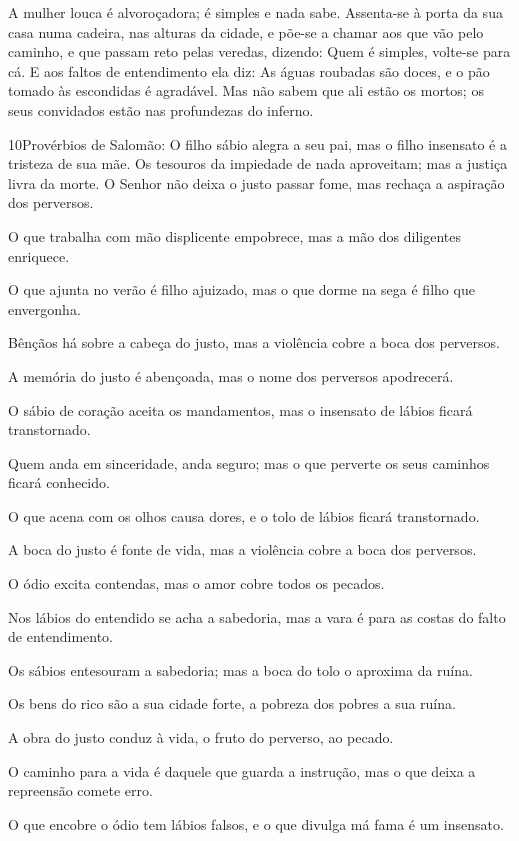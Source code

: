A mulher louca é alvoroçadora; é simples e nada sabe.
Assenta-se à porta da sua casa numa cadeira, nas alturas da
cidade, e põe-se a chamar aos que vão pelo caminho, e que
passam reto pelas veredas, dizendo: Quem é simples, volte-se
para cá. E aos faltos de entendimento ela diz: As águas
roubadas são doces, e o pão tomado às escondidas é agradável.
Mas não sabem que ali estão os mortos; os seus convidados
estão nas profundezas do inferno.

\medskip

\lettrine{10}{}Provérbios de Salomão: O filho sábio alegra a
seu pai, mas o filho insensato é a tristeza de sua mãe.
 Os tesouros da impiedade de nada aproveitam; mas a
justiça livra da morte. O Senhor não deixa o justo passar fome,
mas rechaça a aspiração dos perversos.

O que trabalha com mão displicente empobrece, mas a mão dos
diligentes enriquece.

O que ajunta no verão é filho ajuizado, mas o que dorme na sega é
filho que envergonha.

Bênçãos há sobre a cabeça do justo, mas a violência cobre a boca
dos perversos.

A memória do justo é abençoada, mas o nome dos perversos
apodrecerá.

O sábio de coração aceita os mandamentos, mas o insensato de
lábios ficará transtornado.

Quem anda em sinceridade, anda seguro; mas o que perverte os seus
caminhos ficará conhecido.

O que acena com os olhos causa dores, e o tolo de lábios ficará
transtornado.

A boca do justo é fonte de vida, mas a violência cobre a boca dos
perversos.

O ódio excita contendas, mas o amor cobre todos os pecados.

Nos lábios do entendido se acha a sabedoria, mas a vara é para as
costas do falto de entendimento.

Os sábios entesouram a sabedoria; mas a boca do tolo o aproxima
da ruína.

Os bens do rico são a sua cidade forte, a pobreza dos pobres a
sua ruína.

A obra do justo conduz à vida, o fruto do perverso, ao pecado.

O caminho para a vida é daquele que guarda a instrução, mas o que
deixa a repreensão comete erro.

O que encobre o ódio tem lábios falsos, e o que divulga má fama é
um insensato.

